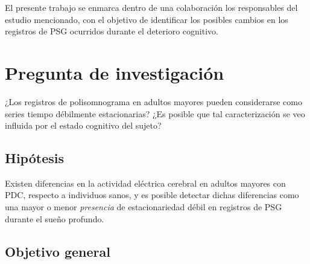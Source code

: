 El presente trabajo se enmarca dentro de una colaboración los responsables del estudio mencionado, 
con el objetivo de identificar los posibles cambios en los registros de PSG ocurridos durante el
deterioro cognitivo.




\section{Pregunta de investigación}

¿Los registros de polisomnograma en adultos mayores pueden considerarse como series tiempo 
débilmente estacionarias?
%
¿Es posible que tal caracterización se veo influida por el estado cognitivo del sujeto?


\subsection{Hipótesis}

Existen diferencias en la actividad eléctrica cerebral en adultos mayores con PDC, respecto a 
individuos sanos, y es posible detectar dichas diferencias como una mayor o menor 
\textit{presencia} de estacionariedad débil en registros de PSG durante el sueño profundo.


\subsection{Objetivo general}

